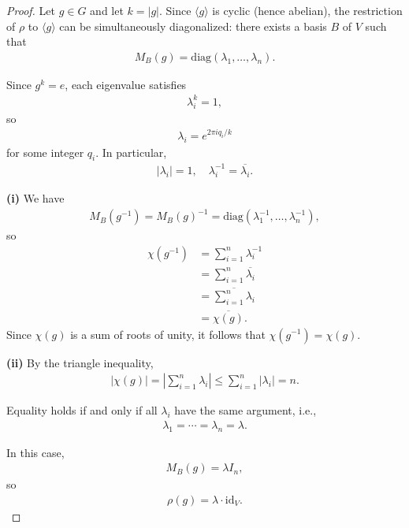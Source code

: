 \documentclass[titlepage]{article}
\theoremstyle{plain}
\theoremstyle{definition}
\theoremstyle{remark}
\theoremstyle{exercise-style}
\numberwithin{equation}{section}
\numberwithin{theorem}{section}
\numberwithin{remark}{section}
\begin{document}
\begin{proof}
    Let $g \in G$ and let $k = |g|$. Since $\langle g \rangle$ is cyclic (hence abelian), the restriction of $\rho$ to $\langle g \rangle$ can be simultaneously diagonalized: there exists a basis $B$ of $V$ such that
    \begin{align}
        M_B(g) = \mathrm{diag}(\lambda_1,\dots,\lambda_n).
    \end{align}
    
    Since $g^k = e$, each eigenvalue satisfies
    \begin{align}
        \lambda_i^k = 1,
    \end{align}
    so
    \begin{align}
        \lambda_i = e^{2\pi i q_i / k}
    \end{align}
    for some integer $q_i$. In particular,
    \begin{align}
        |\lambda_i| = 1, \quad \lambda_i^{-1} = \overline{\lambda_i}.
    \end{align}
    
    \medskip
    
    \textbf{(i)} We have
    \begin{align}
        M_B(g^{-1}) = M_B(g)^{-1} = \mathrm{diag}(\lambda_1^{-1},\dots,\lambda_n^{-1}),
    \end{align}
    so
    \begin{align}
        \chi(g^{-1}) 
        &= \sum_{i=1}^n \lambda_i^{-1} \\
        &= \sum_{i=1}^n \overline{\lambda_i} \\
        &= \overline{\sum_{i=1}^n \lambda_i} \\
        &= \overline{\chi(g)}.
    \end{align}
    Since $\chi(g)$ is a sum of roots of unity, it follows that $\chi(g^{-1}) = \chi(g)$.
    
    \medskip
    
    \textbf{(ii)} By the triangle inequality,
    \begin{align}
        |\chi(g)| = \left|\sum_{i=1}^n \lambda_i\right| \le \sum_{i=1}^n |\lambda_i| = n.
    \end{align}
    
    Equality holds if and only if all $\lambda_i$ have the same argument, i.e.,
    \begin{align}
        \lambda_1 = \cdots = \lambda_n = \lambda.
    \end{align}
    
    In this case,
    \begin{align}
        M_B(g) = \lambda I_n,
    \end{align}
    so
    \begin{align}
        \rho(g) = \lambda \cdot \mathrm{id}_V.
    \end{align}
\end{proof}
\end{document}
